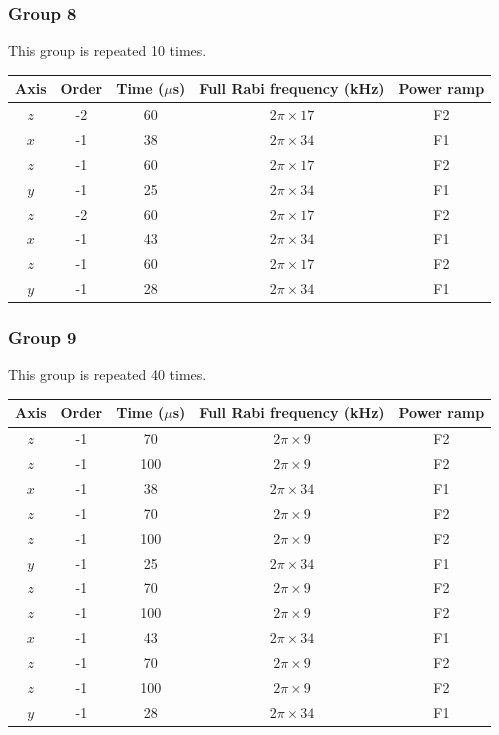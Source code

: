 \documentclass[aps,secnumarabic,amsmath,amssymb]{revtex4}
\begin{document}
\subsubsection{Group 8}
This group is repeated 10 times.
\begin{center}
  \begin{tabular}{|c|c|c|c|c|}
    \hline
    Axis&Order&Time ($\mu$s)&Full Rabi frequency (kHz)&Power ramp\\\hline
    $z$&-2&60&$2\pi\times17$&F2\\\hline
    $x$&-1&38&$2\pi\times34$&F1\\\hline
    $z$&-1&60&$2\pi\times17$&F2\\\hline
    $y$&-1&25&$2\pi\times34$&F1\\\hline
    $z$&-2&60&$2\pi\times17$&F2\\\hline
    $x$&-1&43&$2\pi\times34$&F1\\\hline
    $z$&-1&60&$2\pi\times17$&F2\\\hline
    $y$&-1&28&$2\pi\times34$&F1\\\hline
  \end{tabular}
\end{center}
\subsubsection{Group 9}
This group is repeated 40 times.
\begin{center}
  \begin{tabular}{|c|c|c|c|c|}
    \hline
    Axis&Order&Time ($\mu$s)&Full Rabi frequency (kHz)&Power ramp\\\hline
    $z$&-1&70&$2\pi\times9$&F2\\\hline
    $z$&-1&100&$2\pi\times9$&F2\\\hline
    $x$&-1&38&$2\pi\times34$&F1\\\hline
    $z$&-1&70&$2\pi\times9$&F2\\\hline
    $z$&-1&100&$2\pi\times9$&F2\\\hline
    $y$&-1&25&$2\pi\times34$&F1\\\hline
    $z$&-1&70&$2\pi\times9$&F2\\\hline
    $z$&-1&100&$2\pi\times9$&F2\\\hline
    $x$&-1&43&$2\pi\times34$&F1\\\hline
    $z$&-1&70&$2\pi\times9$&F2\\\hline
    $z$&-1&100&$2\pi\times9$&F2\\\hline
    $y$&-1&28&$2\pi\times34$&F1\\\hline
  \end{tabular}
\end{center}


\end{document}
